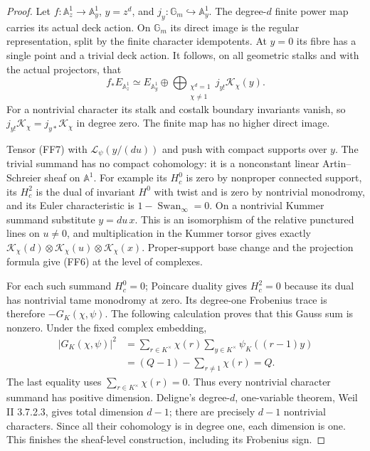 \documentclass[11pt,a4paper]{article}
\theoremstyle{definition}
\begin{document}
\begin{proof}
Let \(f:\mathbb A^1_z\to\mathbb A^1_y\), \(y=z^d\), and
\(j_y:\mathbb G_m\hookrightarrow\mathbb A^1_y\).
The degree-\(d\) finite power map carries its actual deck action.
On \(\mathbb G_m\) its direct image is the regular representation,
split by the finite character idempotents.  At \(y=0\) its fibre
has a single point and a trivial deck action.  It follows, on all
geometric stalks and with the actual projectors, that
\[
 f_*E_{\mathbb A^1_z}
 \simeq E_{\mathbb A^1_y}\oplus
       \bigoplus_{\substack{\chi^d=1\\\chi\ne1}}
                         j_{y!}\mathcal K_\chi(y).     \tag{FF7}
\]
For a nontrivial character its stalk and costalk boundary invariants
vanish, so \(j_{y!}\mathcal K_\chi=j_{y*}\mathcal K_\chi\) in degree
zero.  The finite map has no higher direct image.

Tensor (FF7) with \(\mathcal L_\psi(y/(du))\) and push with compact
supports over \(y\).  The trivial summand has no compact cohomology:
it is a nonconstant linear Artin--Schreier sheaf on \(\mathbb A^1\).
For example its \(H_c^0\) is zero by nonproper connected support,
its \(H_c^2\) is the dual of invariant \(H^0\) with twist and is
zero by nontrivial monodromy, and its Euler characteristic is
\(1-\operatorname{Swan}_\infty=0\).
On a nontrivial Kummer summand substitute \(y=du\,x\).
This is an isomorphism of the relative punctured lines on \(u\ne0\),
and multiplication in the Kummer torsor gives exactly
\(\mathcal K_\chi(d)\otimes\mathcal K_\chi(u)
 \otimes\mathcal K_\chi(x)\).
Proper-support base change and the projection formula give (FF6)
at the level of complexes.

For each such summand \(H_c^0=0\); Poincare duality gives \(H_c^2=0\)
because its dual has nontrivial tame monodromy at zero.  Its degree-one
Frobenius trace is therefore \(-G_K(\chi,\psi)\).
The following calculation proves that this Gauss sum is nonzero.
Under the fixed complex embedding,
\[
 \begin{split}
 |G_K(\chi,\psi)|^2
 &=\sum_{r\in K^\times}\chi(r)
       \sum_{y\in K^\times}\psi_K((r-1)y)\\
 &=(Q-1)-\sum_{r\ne1}\chi(r)=Q.
 \end{split}\tag{FF8}
\]
The last equality uses \(\sum_{r\in K^\times}\chi(r)=0\).
Thus every nontrivial character summand has positive dimension.
Deligne's degree-\(d\), one-variable theorem, Weil II 3.7.2.3,
gives total dimension \(d-1\); there are precisely \(d-1\)
nontrivial characters.  Since all their cohomology is in degree one,
each dimension is one.  This finishes the sheaf-level construction,
including its Frobenius sign.
\end{proof}
\end{document}
